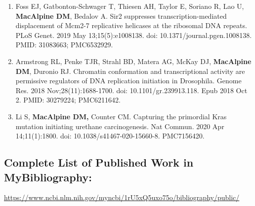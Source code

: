 \documentclass{nihbiosketch}
\begin{document}
\begin{enumerate}
\begin{enumerate}
\item Foss EJ, Gatbonton-Schwager T, Thiesen AH, Taylor E, Soriano R, Lao U, \textbf{MacAlpine DM}, Bedalov A. Sir2 suppresses transcription-mediated displacement of Mcm2-7 replicative helicases at the ribosomal DNA repeats. PLoS Genet. 2019 May 13;15(5):e1008138. doi: 10.1371/journal.pgen.1008138. PMID: 31083663; PMC6532929.

\item Armstrong RL, Penke TJR, Strahl BD, Matera AG, McKay DJ, \textbf{MacAlpine DM}, Duronio RJ. Chromatin conformation and transcriptional activity are permissive regulators of DNA replication initiation in Drosophila. Genome Res. 2018 Nov;28(11):1688-1700. doi: 10.1101/gr.239913.118. Epub 2018 Oct 2. PMID: 30279224; PMC6211642.


\item Li S, \textbf{MacAlpine DM,} Counter CM. Capturing the primordial Kras mutation initiating urethane carcinogenesis. Nat Commun. 2020 Apr 14;11(1):1800. doi: 10.1038/s41467-020-15660-8. PMC7156420.

\end{enumerate}



\end{enumerate}

\subsection*{Complete List of Published Work in MyBibliography:} 
\medskip

\url{https://www.ncbi.nlm.nih.gov/myncbi/1rU5xQ5uxo75o/bibliography/public/}


\end{document}
